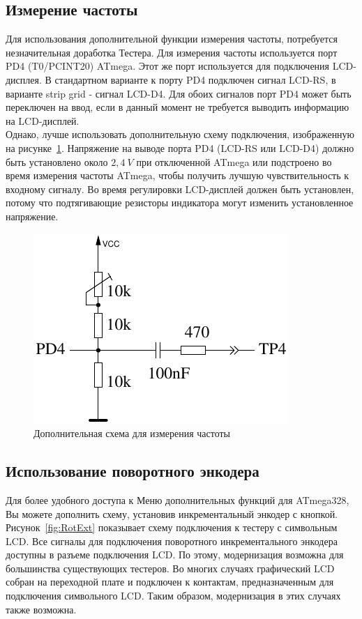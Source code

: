 \subsection{Измерение частоты}
\label{sec:frequency_counter}

Для использования дополнительной функции измерения частоты, потребуется незначительная 
доработка Тестера. Для измерения частоты используется порт PD4 (T0/PCINT20) ATmega. 
Этот же порт используется для подключения LCD-дисплея. В стандартном варианте к порту PD4 подключен 
сигнал LCD-RS, в варианте strip grid - сигнал LCD-D4. Для обоих сигналов порт PD4 может быть переключен 
на ввод, если в данный момент не требуется выводить информацию на LCD-дисплей.\\
 
Однако, лучше использовать дополнительную схему подключения, изображенную на рисунке~\ref{fig:FreqMes}.
Напряжение на выводе порта PD4 (LCD-RS или LCD-D4) должно быть установлено около \(2,4~V\) при отключенной 
ATmega или подстроено во время измерения частоты ATmega, чтобы получить лучшую чувствительность к входному 
сигналу. Во время регулировки LCD-дисплей должен быть установлен, потому что подтягивающие резисторы 
индикатора могут изменить установленное напряжение.

\begin{figure}[H]
\centering
\includegraphics[width=.4\textwidth]{../FIG/Frequency_addon.pdf}
\caption{Дополнительная схема для измерения частоты}
\label{fig:FreqMes}
\end{figure}

\subsection{Использование поворотного энкодера}

Для более удобного доступа к Меню дополнительных функций для ATmega328, Вы можете дополнить схему, установив
инкрементальный энкодер с кнопкой.   
Рисунок~\ref{fig:RotExt} показывает схему подключения к тестеру с символьным LCD.
Все сигналы для подключения поворотного инкрементального энкодера доступны в разъеме 
подключения LCD. По этому, модернизация возможна для большинства существующих тестеров.
Во многих случаях графический LCD собран на переходной плате и подключен к контактам, предназначенным
для подключения символьного LCD. Таким образом, модернизация в этих случаях также возможна.    

